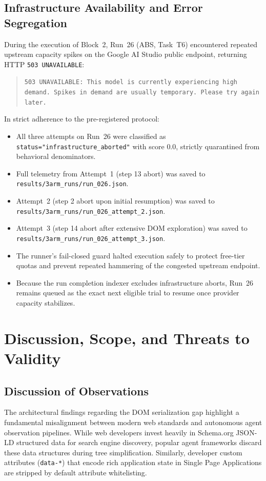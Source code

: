 \documentclass[11pt,a4paper]{article}
\begin{document}
\subsection{Infrastructure Availability and Error Segregation}
During the execution of Block~2, Run~26 (\textsc{ABS}, Task~T6) encountered repeated upstream capacity spikes on the Google AI Studio public endpoint, returning HTTP \texttt{503 UNAVAILABLE}:
\begin{quote}
\texttt{503 UNAVAILABLE: This model is currently experiencing high demand. Spikes in demand are usually temporary. Please try again later.}
\end{quote}
In strict adherence to the pre-registered protocol:
\begin{itemize}
    \item All three attempts on Run~26 were classified as \texttt{status="infrastructure\_aborted"} with score $0.0$, strictly quarantined from behavioral denominators.
    \item Full telemetry from Attempt~1 (step 13 abort) was saved to \texttt{results/3arm\_runs/run\_026.json}.
    \item Attempt~2 (step 2 abort upon initial resumption) was saved to \texttt{results/3arm\_runs/run\_026\_attempt\_2.json}.
    \item Attempt~3 (step 14 abort after extensive DOM exploration) was saved to \texttt{results/3arm\_runs/run\_026\_attempt\_3.json}.
    \item The runner's fail-closed guard halted execution safely to protect free-tier quotas and prevent repeated hammering of the congested upstream endpoint.
    \item Because the run completion indexer excludes infrastructure aborts, Run~26 remains queued as the exact next eligible trial to resume once provider capacity stabilizes.
\end{itemize}

\section{Discussion, Scope, and Threats to Validity}
\label{sec:discussion}

\subsection{Discussion of Observations}
The architectural findings regarding the DOM serialization gap highlight a fundamental misalignment between modern web standards and autonomous agent observation pipelines. While web developers invest heavily in Schema.org JSON-LD structured data for search engine discovery, popular agent frameworks discard these data structures during tree simplification. Similarly, developer custom attributes (\texttt{data-*}) that encode rich application state in Single Page Applications are stripped by default attribute whitelisting.
\end{document}
